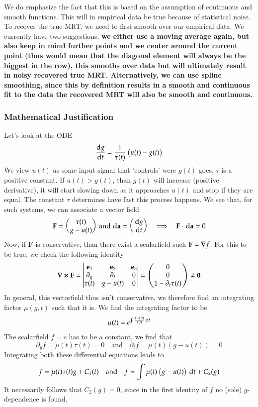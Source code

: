 \documentclass[]{scrartcl}
\begin{document}
We do emphasize the fact that this is based on the assumption of continuous and smooth functions. This will in empirical data be true because of statistical noise. To recover the true MRT, we need to first smooth over our empirical data. We currently have two suggestions, \textbf{we either use a moving average again, but also keep in mind further points and we center around the current point (thus would mean that the diagonal element will always be the biggest in the row), this smooths over data but will ultimately result in noisy recovered true MRT. Alternatively, we can use spline smoothing, since this by definition results in a smooth and continuous fit to the data the recovered MRT will also be smooth and continuous.}

\subsubsection{Mathematical Justification}
Let's look at the ODE
$$
\diff{g}{t} = \frac{1}{\tau(t)}\left(u(t) - g(t)\right)
$$
We view $u(t)$ as some input signal that 'controls' were $g(t)$ goes, $\tau$ is a positive constant. If $u(t) > g(t)$, than $g(t)$ will increase (positive derivative), it will start slowing down as it approaches $u(t)$ and stop if they are equal. The constant $\tau$ determines have fast this process happens. We see that, for such systems, we can associate a vector field
$$
\mathbf{F} = \begin{pmatrix}
\tau(t) \\ g - u(t)
\end{pmatrix}\, \text{and}\, \dl{\mathbf{a}} = \begin{pmatrix}
\dl g \\ \dl t
\end{pmatrix} \quad \Longrightarrow \quad \mathbf{F} \cdot \dl{\mathbf{a}} = 0
$$
Now, if $\mathbf{F}$ is conservative, than there exist a scalarfield such $\mathbf{F} = \grad{f}$. For this to be true, we check the following identity
$$\curl{\mathbf{F}} = \begin{vmatrix}
	\mathbf{e}_1 & \mathbf{e}_2 & \mathbf{e}_3 \\
	\partial_g & \partial_t & 0 \\
	\tau(t) & g - u(t)& 0
\end{vmatrix} = \begin{pmatrix}
0 \\ 0 \\ 1 - \partial_t \tau(t)
\end{pmatrix} \neq \mathbf{0}
$$
In general, this vectorfield thus isn't conservative, we therefore find an integrating factor $\mu(g, t)$ such that it is. We find the integrating factor to be
$$
\mu(t) = e^{\int \frac{1 - \dot{\tau}(t)}{\tau(t)}\dl t }
$$
The scalarfield $f = c$ has to be a constant, we find that
$$
\partial_g f = \mu(t)\tau(t) = 0 \quad \text{and}  \quad \partial_t f = \mu(t)\left(g - u(t)\right) = 0
$$
Integrating both these differential equations leads to
$$
f = \mu(t)\tau(t)g + C_1(t) \quad \text{and} \quad f = \int \mu(t)\left(g - u(t)\right)\dl t + C_2(g)
$$
It necessarily follows that $C_2(g) = 0$, since in the first identity of $f$ no (sole) $g$-dependence is found. 
\end{document}
